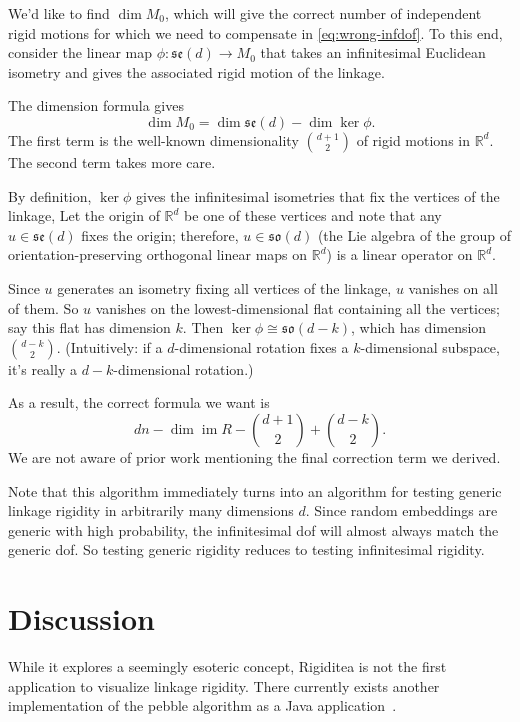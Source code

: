 \documentclass[aps,prd,final,twocolumn,letterpaper,nofootinbib]{revtex4-1}
\newcommand\RR{\mathbb{R}}
\DeclareMathOperator\im{im}
\begin{document}
We'd like to find $\dim M_0$,
which will give the correct number of independent rigid motions
for which we need to compensate in \cref{eq:wrong-infdof}.
To this end,
consider the linear map $\phi\colon\mathfrak{se}(d) \to M_0$
that takes an infinitesimal Euclidean isometry
and gives the associated rigid motion of the linkage.

The dimension formula gives
\[
    \dim M_0 = \dim\mathfrak{se}(d) - \dim\ker\phi.
\]
The first term is the well-known dimensionality $\binom{d+1}{2}$
of rigid motions in $\RR^d$.
The second term takes more care.

By definition, $\ker\phi$ gives the infinitesimal isometries
that fix the vertices of the linkage,
Let the origin of $\RR^d$ be one of these vertices
and note that any $u\in \mathfrak{se}(d)$ fixes the origin;
therefore, $u\in\mathfrak{so}(d)$
(the Lie algebra of the group
of orientation-preserving orthogonal linear maps on $\RR^d$)
is a linear operator on $\RR^d$.

Since $u$ generates an isometry fixing all vertices of the linkage,
$u$ vanishes on all of them.
So $u$ vanishes on the lowest-dimensional flat containing all the vertices;
say this flat has dimension $k$.
Then $\ker\phi\cong\mathfrak{so}(d-k)$, which has dimension $\binom{d-k}{2}$.
(Intuitively: if a $d$-dimensional rotation fixes a $k$-dimensional subspace,
it's really a $d-k$-dimensional rotation.)

As a result, the correct formula we want is
\begin{equation}
    dn - \dim\im R - \binom{d+1}{2} + \binom{d-k}{2}.
\end{equation}
We are not aware of prior work mentioning the final correction term we derived.

Note that this algorithm immediately turns into an algorithm
for testing generic linkage rigidity in arbitrarily many dimensions $d$.
Since random embeddings are generic with high probability,
the infinitesimal dof will almost always match the generic dof.
So testing generic rigidity reduces to testing infinitesimal rigidity.


\section{Discussion}

While it explores a seemingly esoteric concept,
Rigiditea is not the first application to visualize linkage rigidity.
There currently exists another
implementation of the pebble algorithm as a Java application~\cite{stjohnapplet}.
\end{document}
